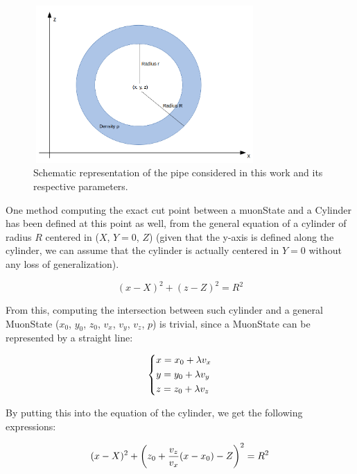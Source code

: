 \documentclass[a4paper, 11pt]{report}
\begin{document}
\begin{figure}[htbp]
\centering
\begin{minipage}[b]{.49\textwidth}
\includegraphics[width=8.5cm, height=6cm]{figs/cylinder.png}
\end{minipage}\hfill
\caption{Schematic representation of the pipe considered in this work and its respective parameters.}
\label{fig:cylinder}
\end{figure}

One method computing the exact cut point between a muonState and a Cylinder has been defined at this point as well, from the general equation of a cylinder of radius $R$ centered in ($X$, $Y = 0$, $Z$) (given that the y-axis is defined along the cylinder, we can assume that the cylinder is actually centered in $Y = 0$ without any loss of generalization).

\begin{equation}
\label{eq:cylinder}
(x - X)^2 + (z - Z)^2 = R^2
\end{equation}

From this, computing the intersection between such cylinder and a general MuonState ($x_0$, $y_0$, $z_0$, $v_{x}$, $v_{y}$, $v_{z}$, $p$) is trivial, since a MuonState can be represented by a straight line: 

\begin{equation}
\label{eq:line}
\begin{dcases}
x = x_0 + \lambda v_x \\
y = y_0 + \lambda v_y \\
z = z_0 + \lambda v_z
\end{dcases}
\end{equation}

By putting this into the equation of the cylinder, we get the following expressions:

\begin{equation}
\label{eq:together}
(x - X)^2 + \left (z_0 + \frac{v_z}{v_x} (x - x_0) - Z \right )^2 = R^2 \\
\end{equation}
\end{document}
